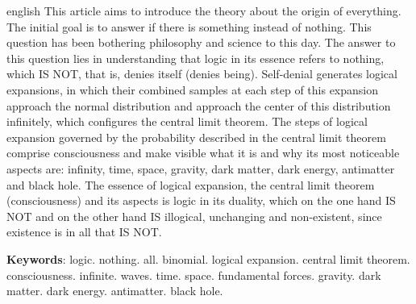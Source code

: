 \renewcommand{\resumoname}{Abstract}
\begin{resumoumacoluna}
 \begin{otherlanguage*}{english}
\vspace{-2mm}
	This article aims to introduce the theory about the origin of everything. The initial goal is to answer if there is something instead of nothing. This question has been bothering philosophy and science to this day. The answer to this question lies in understanding that logic in its essence refers to nothing, which IS NOT, that is, denies itself (denies being). Self-denial generates logical expansions, in which their combined samples at each step of this expansion approach the normal distribution and approach the center of this distribution infinitely, which configures the central limit theorem. The steps of logical expansion governed by the probability described in the central limit theorem comprise consciousness and make visible what it is and why its most noticeable aspects are: infinity, time, space, gravity, dark matter, dark energy, antimatter and black hole. The essence of logical expansion, the central limit theorem (consciousness) and its aspects is logic in its duality, which on the one hand IS NOT and on the other hand IS illogical, unchanging and non-existent, since existence is in all that IS NOT.
	\vspace{\onelineskip} 
	\noindent
	
	\textbf{Keywords}: logic. nothing. all. binomial. logical expansion. central limit theorem. consciousness. infinite. waves. time. space. fundamental forces. gravity. dark matter. dark energy. antimatter. black hole.
 \end{otherlanguage*}  
\end{resumoumacoluna}
